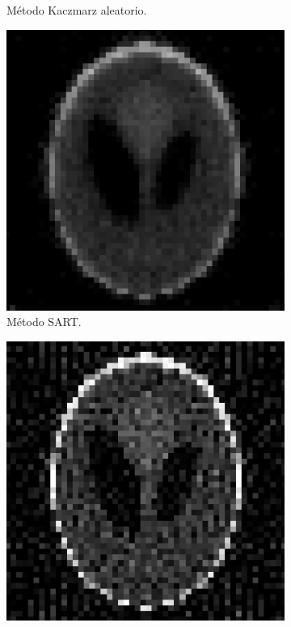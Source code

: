 \documentclass[letterpaper,12pt]{article}
\theoremstyle{plain}
\begin{document}
\begin{figure}[H]
\begin{subfigure}[h]{0.32\linewidth}
            \caption{Método Kaczmarz aleatorio.}
         \label{fig:noise_coseno}
       \end{subfigure}
         \begin{subfigure}[h]{0.32\linewidth}
            \centering
            \includegraphics[width=\textwidth]{Figuras/sart_rec.png}
            \caption{Método SART.}
            \label{fig:noise_hamming}
         \end{subfigure}
         \begin{subfigure}[h]{0.32\linewidth}
            \centering
            \includegraphics[width=\textwidth]{Figuras/fbp_rec.png}

\end{subfigure}
\end{figure}
\end{document}
